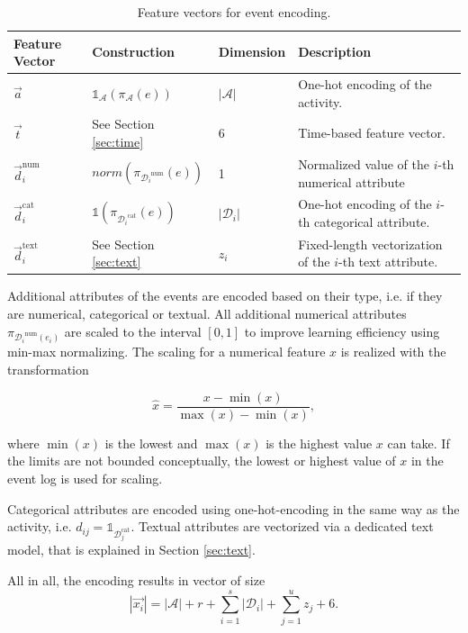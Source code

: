 \begin{table}[!htbp]
	\renewcommand{\arraystretch}{1.2}
	\begin{tabularx}{\textwidth}{p{2cm} l l p{6.8cm} }
		\toprule
		\textbf{Feature} \newline \textbf{Vector} & \textbf{Construction} &\textbf{Dimension} &  \textbf{Description} \\
		\midrule
		$\vec{a}$ &$\mathds{1}_\mathcal{A}(\pi_\mathcal{A}(e))$& $|\mathcal{A}|$& One-hot encoding of the activity. \\
		$\vec{t}$ & See Section \ref{sec:time} &6 & Time-based feature vector.\\
		$\vec{d}_i^\mathrm{num}$ &  $norm(\pi_{{\mathcal{D}_i}^\mathrm{num}}(e)) $ &1 & Normalized value of the $i$-th numerical attribute\\
		$\vec{d}_i^\mathrm{cat}$ & $\mathds{1}(\pi_{{\mathcal{D}_i}^\mathrm{cat}}(e))$&$|\mathcal{D}_i|$ & One-hot encoding of the $i$-th categorical attribute.\\
		$\vec{d}_i^\mathrm{text}$ & See Section \ref{sec:text} & $z_i$& Fixed-length vectorization of the $i$-th text attribute.\\
		\bottomrule
	\end{tabularx}
	\caption{Feature vectors for event encoding.}
	\label{tab:features}
\end{table}

Additional attributes of the events are encoded based on their type, i.e. if they are numerical, categorical or textual.
All additional numerical attributes $\pi_{{\mathcal{D}_i}^\mathrm{num}(e_i)}$ are scaled to the interval $ [0, 1]$ to improve learning efficiency using min-max normalizing.
The scaling for a numerical feature $x$ is realized with the transformation

$$\hat{x} = \dfrac{x-\min(x)}{\max(x) - \min(x)},$$

where $\min(x)$ is the lowest and $\max(x)$ is the highest value $x$ can take.
If the limits are not bounded conceptually, the lowest or highest value of $x$ in the event log is used for scaling.

Categorical attributes are encoded using one-hot-encoding in the same way as the activity, i.e. $d_{ij} = \mathds{1}_{\mathcal{D}_j^{\mathrm{cat}}}$.
Textual attributes are vectorized via a dedicated text model, that is explained in Section \ref{sec:text}.

All in all, the encoding results in vector of size
\begin{equation*}
|\vec{x_i}|= |\mathcal{A}| + r + \sum_{i=1}^{s} |\mathcal{D}_i| + \sum_{j=1}^{u} z_j + 6.
\end{equation*}


